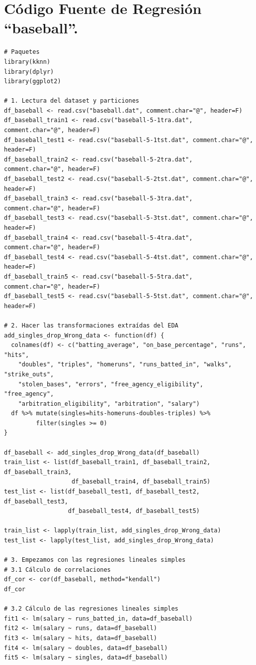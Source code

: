 \documentclass[a4paper,12pt, oneside]{book}
\begin{document}
\chapter{Código Fuente de Regresión ``baseball''.}
\begin{verbatim}
# Paquetes
library(kknn)
library(dplyr)
library(ggplot2)

# 1. Lectura del dataset y particiones
df_baseball <- read.csv("baseball.dat", comment.char="@", header=F)
df_baseball_train1 <- read.csv("baseball-5-1tra.dat", comment.char="@", header=F)
df_baseball_test1 <- read.csv("baseball-5-1tst.dat", comment.char="@", header=F)
df_baseball_train2 <- read.csv("baseball-5-2tra.dat", comment.char="@", header=F)
df_baseball_test2 <- read.csv("baseball-5-2tst.dat", comment.char="@", header=F)
df_baseball_train3 <- read.csv("baseball-5-3tra.dat", comment.char="@", header=F)
df_baseball_test3 <- read.csv("baseball-5-3tst.dat", comment.char="@", header=F)
df_baseball_train4 <- read.csv("baseball-5-4tra.dat", comment.char="@", header=F)
df_baseball_test4 <- read.csv("baseball-5-4tst.dat", comment.char="@", header=F)
df_baseball_train5 <- read.csv("baseball-5-5tra.dat", comment.char="@", header=F)
df_baseball_test5 <- read.csv("baseball-5-5tst.dat", comment.char="@", header=F)

# 2. Hacer las transformaciones extraídas del EDA
add_singles_drop_Wrong_data <- function(df) {
  colnames(df) <- c("batting_average", "on_base_percentage", "runs", "hits", 
  	"doubles", "triples", "homeruns", "runs_batted_in", "walks", "strike_outs", 
  	"stolen_bases", "errors", "free_agency_eligibility", "free_agency",
    "arbitration_eligibility", "arbitration", "salary")
  df %>% mutate(singles=hits-homeruns-doubles-triples) %>%
         filter(singles >= 0)
}

df_baseball <- add_singles_drop_Wrong_data(df_baseball)
train_list <- list(df_baseball_train1, df_baseball_train2, df_baseball_train3, 
	               df_baseball_train4, df_baseball_train5)
test_list <- list(df_baseball_test1, df_baseball_test2, df_baseball_test3,
                  df_baseball_test4, df_baseball_test5)

train_list <- lapply(train_list, add_singles_drop_Wrong_data)
test_list <- lapply(test_list, add_singles_drop_Wrong_data)

# 3. Empezamos con las regresiones lineales simples
# 3.1 Cálculo de correlaciones
df_cor <- cor(df_baseball, method="kendall")
df_cor

# 3.2 Cálculo de las regresiones lineales simples
fit1 <- lm(salary ~ runs_batted_in, data=df_baseball)
fit2 <- lm(salary ~ runs, data=df_baseball)
fit3 <- lm(salary ~ hits, data=df_baseball)
fit4 <- lm(salary ~ doubles, data=df_baseball)
fit5 <- lm(salary ~ singles, data=df_baseball)


\end{verbatim}
\end{document}
